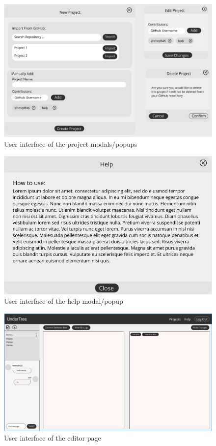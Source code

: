 \documentclass[12pt, titlepage]{article}
\begin{document}
	\begin{figure}[H]
		\centering
		\includegraphics[width=\linewidth]{projectModals.png}
		\caption{User interface of the project modals/popups}
	\end{figure}
	
	\begin{figure}[H]
		\centering
		\includegraphics[width=\linewidth]{helpModal.png}
		\caption{User interface of the help modal/popup}
	\end{figure}
	
	\begin{figure}[H]
		\centering
		\includegraphics[width=\linewidth]{editorPage.png}
		\caption{User interface of the editor page}
	\end{figure}
	
\end{document}
